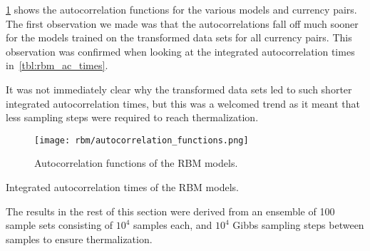 \cref{fig:rbm_autocorrelation_functions} shows the autocorrelation functions for the various models and currency pairs.
The first observation we made was that the autocorrelations fall off much sooner for the models trained on the transformed data sets for all currency pairs.
This observation was confirmed when looking at the integrated autocorrelation times in~\cref{tbl:rbm_ac_times}.

It was not immediately clear why the transformed data sets led to such shorter integrated autocorrelation times, but this was a welcomed trend as it meant that less sampling steps were required to reach thermalization.
\begin{figure}[!htb]
    \begin{center}
        \texttt{[image: rbm/autocorrelation\_functions.png]}
    \end{center}
    \caption{
        Autocorrelation functions of the RBM models.
    }
    \label{fig:rbm_autocorrelation_functions}
\end{figure}
\begin{table}[!htb]
    \centering
    \begin{adjustbox}{max width=\textwidth}
        
    \end{adjustbox}
    \caption{
        Integrated autocorrelation times of the RBM models.
    }
    \label{tbl:rbm_ac_times}
\end{table}

The results in the rest of this section were derived from an ensemble of 100 sample sets consisting of \( 10^4 \) samples each, and \( 10^4 \) Gibbs sampling steps between samples to ensure thermalization.

